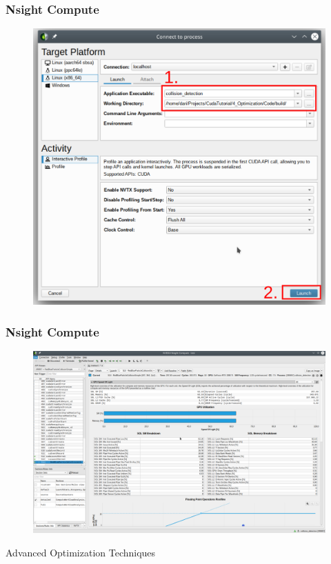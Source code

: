 \documentclass[aspectratio=169,handout]{beamer}
\begin{document}
\frame
{
	\frametitle{Nsight Compute}
		\begin{figure}
	\centering
	\includegraphics[height=0.95\textheight]{nsc2}
\end{figure}
}
\frame
{
	\frametitle{Nsight Compute}
		\begin{figure}
	\centering
	\includegraphics[height=0.95\textheight]{nsc3}
\end{figure}
}


\frame
{
\begin{center}
\Large Advanced Optimization Techniques
\end{center}
}
\end{document}
